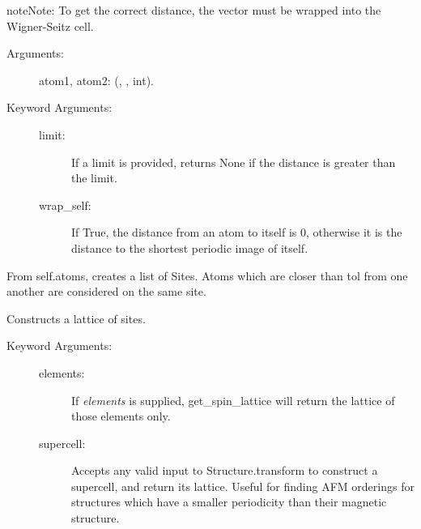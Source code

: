 \documentclass[letterpaper,10pt,english]{sphinxmanual}
\begin{document}
\begin{fulllineitems}
\begin{fulllineitems}
\begin{notice}{note}{Note:}
To get the correct distance, the vector must be wrapped into the
Wigner-Seitz cell.
\end{notice}
\begin{description}
\item[{Arguments:}] \leavevmode
atom1, atom2: ({\hyperref[models:qmpy.Atom]{}}, {\hyperref[models:qmpy.Site]{}}, int).

\item[{Keyword Arguments:}] \leavevmode\begin{description}
\item[{limit: }] \leavevmode
If a limit is provided, returns None if the distance is
greater than the limit.

\item[{wrap\_self: }] \leavevmode
If True, the distance from an atom to itself is 0, otherwise it
is the distance to the shortest periodic image of itself.

\end{description}

\end{description}

\end{fulllineitems}


\begin{fulllineitems}
\label{models:qmpy.Structure.get_sites}
From self.atoms, creates a list of Sites. Atoms which are closer
than tol from one another are considered on the same site.

\end{fulllineitems}


\begin{fulllineitems}
\label{models:qmpy.Structure.get_spin_lattice}
Constructs a lattice of sites.
\begin{description}
\item[{Keyword Arguments:}] \leavevmode\begin{description}
\item[{elements:}] \leavevmode
If \emph{elements} is supplied, get\_spin\_lattice will return the 
lattice of those elements only.

\item[{supercell:}] \leavevmode
Accepts any valid input to Structure.transform to construct a
supercell, and return its lattice. Useful for finding AFM
orderings for structures which have a smaller periodicity than
their magnetic structure.


\end{description}
\end{description}
\end{fulllineitems}
\end{fulllineitems}
\end{document}

